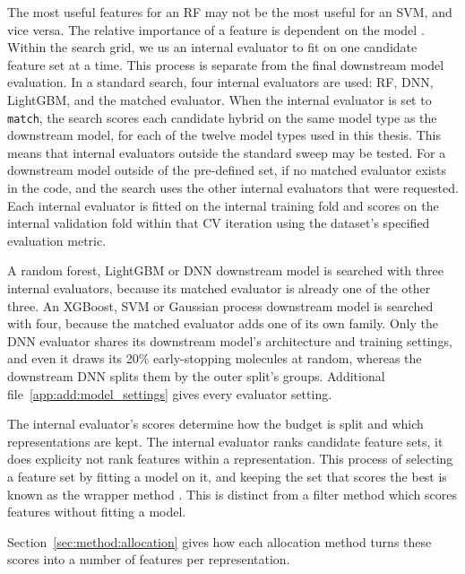 The most useful features for an RF may not be the most useful for an SVM, and vice versa. The relative importance of a feature is dependent on the model \citep{Dong2020}. Within the search grid, we us an internal evaluator to fit on one candidate feature set at a time. This process is separate from the final downstream model evaluation. In a standard search, four internal evaluators are used: RF, DNN, LightGBM, and the matched evaluator. When the internal evaluator is set to \texttt{match}, the search scores each candidate hybrid on the same model type as the downstream model, for each of the twelve model types used in this thesis. This means that internal evaluators outside the standard sweep may be tested.  For a downstream model outside of the pre-defined set, if no matched evaluator exists in the code, and the search uses the other internal evaluators that were requested. Each internal evaluator is fitted on the internal training fold and scores on the internal validation fold within that CV iteration using the dataset's specified evaluation metric. 

A random forest, LightGBM or DNN downstream model is searched with three internal evaluators, because its matched evaluator is already one of the other three. An XGBoost, SVM or Gaussian process downstream model is searched with four, because the matched evaluator adds one of its own family. Only the DNN evaluator shares its downstream model's architecture and training settings, and even it draws its 20\% early-stopping molecules at random, whereas the downstream DNN splits them by the outer split's groups. Additional file~\ref{app:add:model_settings} gives every evaluator setting.

The internal evaluator's scores determine how the budget is split and which representations are kept. The internal evaluator ranks candidate feature sets, it does explicity not rank features within a representation. This process of selecting a feature set by fitting a model on it, and keeping the set that scores the best is known as the wrapper method \citep{Kohavi1997}. This is distinct from a filter method which scores features without fitting a model. 

Section~\ref{sec:method:allocation} gives how each allocation method turns these scores into a number of features per representation.


